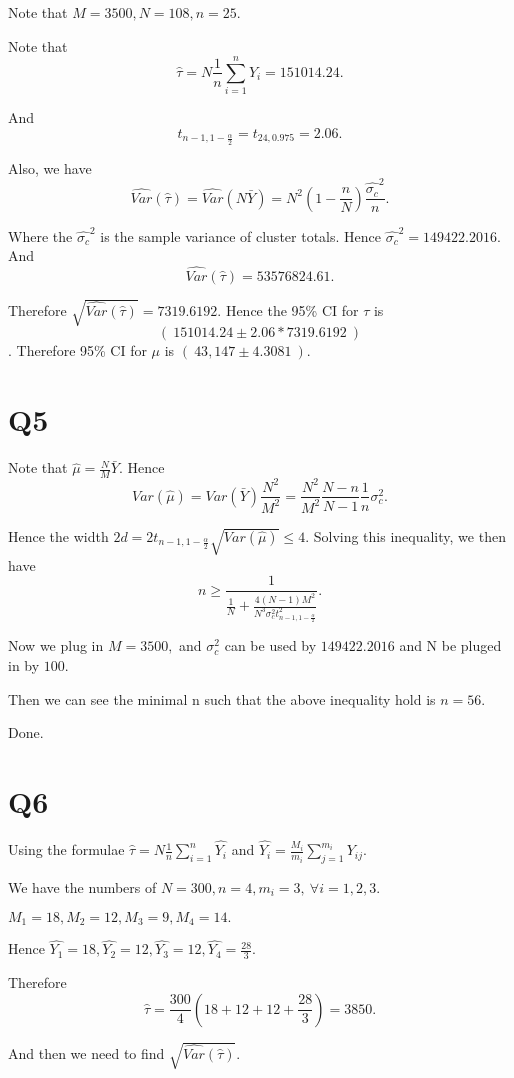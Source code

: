\documentclass[12pt]{article}%
\begin{document}
Note that $M=3500, N=108, n=25.$ 

Note that $$\hat{\tau}=N\frac{1}{n}\sum_{i=1}^{n}Y_i=151014.24.$$

And $$t_{n-1,1-\frac{\alpha}{2}}=t_{24,0.975}=2.06.$$

Also, we have $$\hat{Var}(\hat{\tau})=\hat{Var}(N\bar{Y})=N^2(1-\frac{n}{N})\frac{\hat{\sigma_c}^2}{n}.$$

Where the $\hat{\sigma_c}^2$ is the sample variance of cluster totals. Hence $\hat{\sigma_c}^2=149422.2016.$ And $$\hat{Var}(\hat{\tau})=53576824.61.$$

Therefore $\sqrt{\hat{Var}(\hat{\tau})}=7319.6192.$ Hence the 95\% CI for $\tau$ is $$(~151014.24 \pm 2.06*7319.6192~)$$. Therefore 95\% CI for $\mu$ is $(~43,147 \pm 4.3081~).$


\section{Q5}
Note that $\hat{\mu}=\frac{N}{M}\bar{Y}.$ Hence $$Var(\hat{\mu})=Var(\bar{Y})\frac{N^2}{M^2}=\frac{N^2}{M^2}\frac{N-n}{N-1}\frac{1}{n}\sigma_c^2.$$

Hence the width $2d=2t_{n-1,1-\frac{\alpha}{2}}\sqrt{Var(\hat{\mu})} \leq 4.$ Solving this inequality, we then have $$n \geq \frac{1}{\frac{1}{N} + \frac{4(N-1)M^2}{N^3 \sigma_c^2 t_{n-1,1-\frac{\alpha}{2}}^2 } }.$$ 

Now we plug in $M=3500,$ and $\sigma_c^2$ can be used by $149422.2016$ and N be pluged in by $100$. 

Then we can see the minimal n such that the above inequality hold is $n=56$.

Done. 


\section{Q6}
Using the formulae $\hat{\tau}=N\frac{1}{n} \sum_{i=1}^{n}\hat{Y_i}$ and $\hat{Y_i}=\frac{M_i}{m_i}\sum_{j=1}^{m_i}Y_{ij}.$ 

We have the numbers of $N=300, n=4, m_i=3,~ \forall i=1,2,3.$

$M_1 = 18, M_2 = 12, M_3 = 9, M_4 = 14.$

Hence $\hat{Y_1} = 18, \hat{Y_2} = 12, \hat{Y_3} = 12, \hat{Y_4} = \frac{28}{3}.$

Therefore $$\hat{\tau} = \frac{300}{4}(18+12+12+\frac{28}{3})=3850.$$ 

And then we need to find $\sqrt{\hat{Var}(\hat{\tau})}.$
\end{document}
